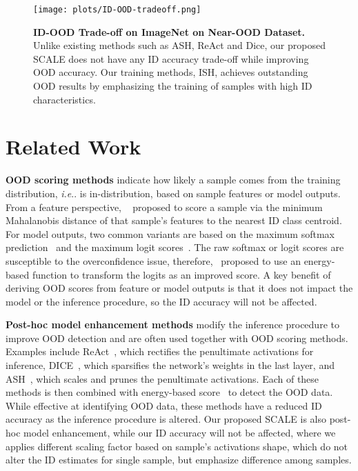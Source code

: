 \documentclass{article} %
\makeatletter
\theoremstyle{plain}
\DeclareRobustCommand\onedot{\futurelet\@let@token\@onedot}
\def\@onedot{\ifx\@let@token.\else.\null\fi\xspace}
\def\ie{\emph{i.e}\onedot} \def\Ie{\emph{I.e}\onedot}
\makeatother
\begin{document}
\begin{figure}
    \centering 
	\texttt{[image: plots/ID-OOD-tradeoff.png]}
	\caption{\textbf{ID-OOD Trade-off on ImageNet on Near-OOD Dataset.} Unlike existing methods such as ASH, ReAct and Dice, our proposed SCALE does not have any ID accuracy trade-off while improving OOD accuracy. Our training methods, ISH, achieves outstanding OOD results by emphasizing the training of samples with high ID characteristics. 
 }\label{fig:id-ood-tradeoff}
\end{figure}


\section{Related Work}

\textbf{OOD scoring methods} indicate how likely a sample comes from the training distribution, \ie is in-distribution, based on sample features or model outputs.  From a feature perspective, ~\cite{DBLP:conf/nips/LeeLLS18/MDS} proposed to score a sample via the minimum Mahalanobis distance of that sample's features to the nearest ID class centroid. For model outputs, two common variants are based on the maximum softmax prediction~\citep{DBLP:conf/iclr/HendrycksG17/MSP} and the maximum logit scores~\citep{DBLP:conf/icml/HendrycksBMZKMS22/MLS}. The raw softmax or logit scores are susceptible to the overconfidence issue, therefore,~\cite{DBLP:conf/nips/LiuWOL20/EBO} proposed to use an energy-based function to transform the logits as an improved score.  A key benefit of deriving OOD scores from feature or model outputs is that it does not impact the model or the inference procedure, so the ID accuracy will not be affected.  


\textbf{Post-hoc model enhancement methods} modify the inference procedure to improve OOD detection and are often used together with OOD scoring methods.  
Examples include ReAct~\citep{DBLP:conf/nips/SunGL21/ReAct}, which rectifies the penultimate activations for inference,  DICE~\citep{DBLP:conf/eccv/SunL22a/DICE}, which sparsifies the network's weights in the last layer, and 
ASH~\citep{DBLP:conf/iclr/DjurisicBAL23/ASH}, which scales and prunes the penultimate activations. Each of these methods is then combined with energy-based score~\citep{DBLP:conf/nips/LiuWOL20/EBO} to detect the OOD data.  While effective at identifying OOD data, these methods have a reduced ID accuracy as the inference procedure is altered.  
Our proposed SCALE is also post-hoc model enhancement, while our ID accuracy will not be affected, where we applies different scaling factor based on sample's activations shape, which do not alter the ID estimates for single sample, but emphasize difference among samples.
\end{document}
